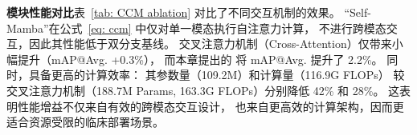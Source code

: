 

\textbf{模块性能对比}\quad 表~\ref{tab: CCM ablation} 对比了不同交互机制的效果。
“Self-Mamba”在公式~\ref{eq: ccm} 中仅对单一模态执行自注意力计算，
不进行跨模态交互，因此其性能低于双分支基线。
交叉注意力机制（Cross-Attention）仅带来小幅提升（mAP@Avg. +0.3\%），
而本章提出的 \crossblockshort 将 mAP@Avg. 提升了 2.2\%。
同时，\crossblockshort 具备更高的计算效率：
其参数量（109.2M）和计算量（116.9G FLOPs）
较交叉注意力机制（188.7M Params, 163.3G FLOPs）分别降低 42\% 和 28\%。
这表明性能增益不仅来自有效的跨模态交互设计，
也来自更高效的计算架构，因而更适合资源受限的临床部署场景。

